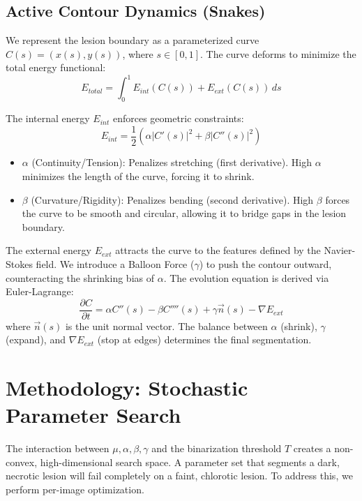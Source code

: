 \documentclass[journal]{IEEEtran}
\begin{document}
\subsection{Active Contour Dynamics (Snakes)}
We represent the lesion boundary as a parameterized curve $C(s) = (x(s), y(s))$, where $s \in [0, 1]$. The curve deforms to minimize the total energy functional:
\begin{equation}
E_{total} = \int_{0}^{1} E_{int}(C(s)) + E_{ext}(C(s)) \, ds
\end{equation}

The internal energy $E_{int}$ enforces geometric constraints:
\begin{equation}
E_{int} = \frac{1}{2} \left( \alpha |C'(s)|^2 + \beta |C''(s)|^2 \right)
\end{equation}
\begin{itemize}
    \item $\alpha$ (Continuity/Tension): Penalizes stretching (first derivative). High $\alpha$ minimizes the length of the curve, forcing it to shrink.
    \item $\beta$ (Curvature/Rigidity): Penalizes bending (second derivative). High $\beta$ forces the curve to be smooth and circular, allowing it to bridge gaps in the lesion boundary.
\end{itemize}

The external energy $E_{ext}$ attracts the curve to the features defined by the Navier-Stokes field. We introduce a Balloon Force ($\gamma$) to push the contour outward, counteracting the shrinking bias of $\alpha$. The evolution equation is derived via Euler-Lagrange:
\begin{equation}
\frac{\partial C}{\partial t} = \alpha C''(s) - \beta C''''(s) + \gamma \vec{n}(s) - \nabla E_{ext}
\end{equation}
where $\vec{n}(s)$ is the unit normal vector. The balance between $\alpha$ (shrink), $\gamma$ (expand), and $\nabla E_{ext}$ (stop at edges) determines the final segmentation.

\section{Methodology: Stochastic Parameter Search}

The interaction between $\mu, \alpha, \beta, \gamma$ and the binarization threshold $T$ creates a non-convex, high-dimensional search space. A parameter set that segments a dark, necrotic lesion will fail completely on a faint, chlorotic lesion. To address this, we perform per-image optimization.
\end{document}
